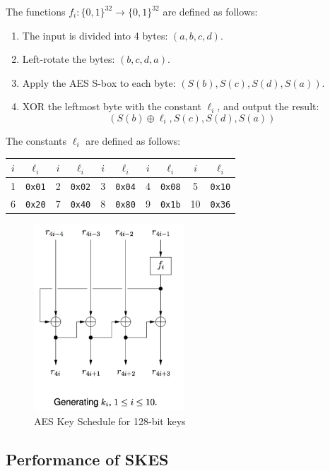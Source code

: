 \documentclass[12pt,titlepage]{article}
\begin{document}
The functions $f_i : \{0, 1\}^{32} \rightarrow \{0, 1\}^{32}$ are defined as follows: \begin{enumerate}
\item The input is divided into 4 bytes: $(a, b, c, d)$.
\item Left-rotate the bytes: $(b, c, d, a)$.
\item Apply the AES S-box to each byte: $(S(b), S(c), S(d), S(a))$.
\item XOR the leftmost byte with the constant $\ell_i$, and output the result: $$(S(b) \oplus \ell_i, S(c), S(d), S(a))$$
\end{enumerate}
The constants $\ell_i$ are defined as follows: 

\begin{center}
	\begin{tabular}{cc|cc|cc|cc|cc}
		$i$ & $\ell_i$      & $i$ & $\ell_i$      & $i$ & $\ell_i$      & $i$ & $\ell_i$      & $i$ & $\ell_i$      \\
		\hline
		1   & \texttt{0x01} & 2   & \texttt{0x02} & 3   & \texttt{0x04} & 4   & \texttt{0x08} & 5   & \texttt{0x10} \\
		6   & \texttt{0x20} & 7   & \texttt{0x40} & 8   & \texttt{0x80} & 9   & \texttt{0x1b} & 10  & \texttt{0x36} 
	\end{tabular}
\end{center}
\newpage
\begin{center}
	\begin{figure}[h!]
		\includegraphics[width=0.5\textwidth]{AES_Key_Schedule.png}
		\caption{AES Key Schedule for 128-bit keys}
	\end{figure}
\end{center}

\subsection{Performance of SKES}
\end{document}
